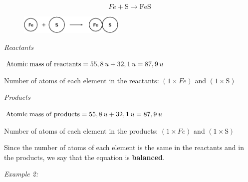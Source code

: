     \begin{equation}
    Fe+\mathrm{S}\to \mathrm{FeS}\tag{13.1}
      \end{equation}
        \par 
        \label{m38726*id63273}
    \setcounter{subfigure}{0}
	\begin{figure}[H] %
    \begin{center}
    \label{m38726*id63276!!!underscore!!!media}\label{m38726*id63276!!!underscore!!!printimage}\includegraphics[width=5cm]{col11305.imgs/m38726_CG10C5_001.png} %
      \vspace{2pt}
    \vspace{.1in}
    \end{center}
 \end{figure}       
        \par 
        \label{m38726*id63282}
          \textsl{Reactants}
        \par 
        \label{m38726*id63288}$\mathrm{Atomic\; mass\; of\; reactants}=55,8\phantom{\rule{2pt}{0ex}}u+32,1\phantom{\rule{2pt}{0ex}}u=\mathrm{87,9}\phantom{\rule{2pt}{0ex}}u$\par 
        \label{m38726*id63292}Number of atoms of each element in the reactants: $\left(1\ensuremath{\times}Fe\right)$ and $\left(1\ensuremath{\times}\mathrm{S}\right)$\par 
        \label{m38726*id63311}
          \textsl{Products}
        \par 
        \label{m38726*id63320}$\mathrm{Atomic\; mass\; of\; products}=55,8\phantom{\rule{2pt}{0ex}}u+32,1\phantom{\rule{2pt}{0ex}}u=\mathrm{87,9}\phantom{\rule{2pt}{0ex}}u$\par 
        \label{m38726*id63323}Number of atoms of each element in the products: $\left(1\ensuremath{\times}Fe\right)$ and $\left(1\ensuremath{\times}\mathrm{S}\right)$\par 
        \label{m38726*id63343}Since the number of atoms of each element is the same in the reactants and in the products, we say that the equation is \textbf{balanced}.\par 
        \label{m38726*id63352}
          \textsl{Example 2:}
        \label{m38726*id63361}\nopagebreak\noindent{}
          
